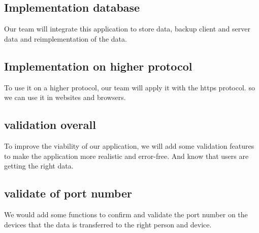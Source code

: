     \subsection{Implementation database}\label{subsec:implementation-database}
    Our team will integrate this application to store data, backup client and server data and 
    reimplementation of the data.

    \subsection{Implementation on higher protocol}\label{subsec:implementation-on-higher-protocol}
    To use it on a higher protocol, our team will apply it with the https protocol. 
    so we can use it in websites and browsers.


	\subsection{validation overall}\label{subsec:validation overall}
	To improve the viability of our application, we will add some validation features to make the application more realistic and error-free.
	And know that users are getting the right data.
	

   \subsection{validate of port number}\label{subsec:validate of port number}
	We would add some functions to confirm and validate the port number on the devices
	that the data is transferred to the right person and device.
   




